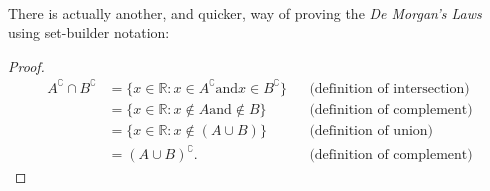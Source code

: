 \documentclass{amsart} %
\theoremstyle{definition} %
\theoremstyle{proposition} %
\theoremstyle{remark} %
\begin{document}
\hfill\\

There is actually another, and quicker, way of proving the \emph{De Morgan's Laws} using set-builder notation:

\begin{proof}
      \begin{align*} %
            A^\complement \cap B^\complement
            &= \{x \in \mathbb{R}: x \in A^\complement \text{and} x\in B^\complement \} && \text{(definition of intersection)} \\
            &= \{x \in \mathbb{R}: x \not\in A \text{and} \not\in B \} && \text{(definition of complement)} \\
            &= \{x \in \mathbb{R}: x \not\in (A \cup B) \} && \text{(definition of union)} \\
            &= (A \cup B)^\complement. && \text{(definition of complement)}
      \end{align*}
\end{proof}
\end{document}
